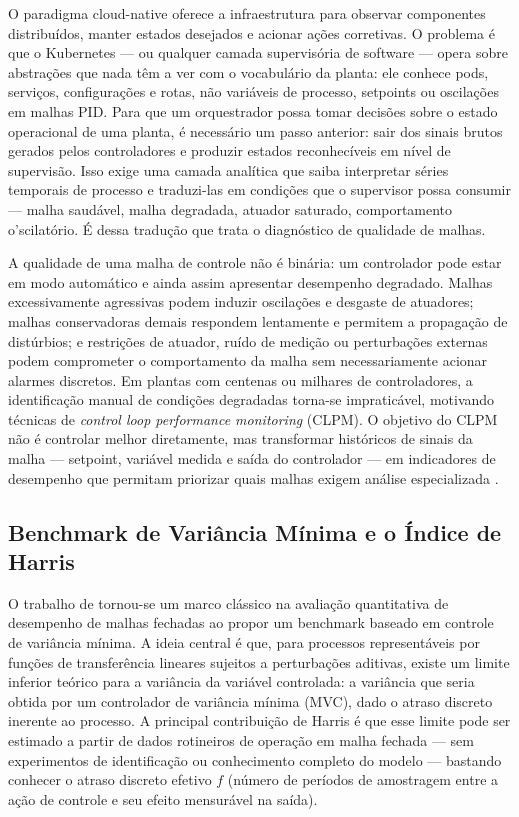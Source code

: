O paradigma cloud-native oferece a infraestrutura para observar componentes distribuídos, manter estados desejados e acionar ações corretivas. O problema é que o Kubernetes --- ou qualquer camada supervisória de software --- opera sobre abstrações que nada têm a ver com o vocabulário da planta: ele conhece pods, serviços, configurações e rotas, não variáveis de processo, setpoints ou oscilações em malhas PID. Para que um orquestrador possa tomar decisões sobre o estado operacional de uma planta, é necessário um passo anterior: sair dos sinais brutos gerados pelos controladores e produzir estados reconhecíveis em nível de supervisão. Isso exige uma camada analítica que saiba interpretar séries temporais de processo e traduzi-las em condições que o supervisor possa consumir --- malha saudável, malha degradada, atuador saturado, comportamento o'scilatório. É dessa tradução que trata o diagnóstico de qualidade de malhas.

A qualidade de uma malha de controle não é binária: um controlador pode estar em modo automático e ainda assim apresentar desempenho degradado. Malhas excessivamente agressivas podem induzir oscilações e desgaste de atuadores; malhas conservadoras demais respondem lentamente e permitem a propagação de distúrbios; e restrições de atuador, ruído de medição ou perturbações externas podem comprometer o comportamento da malha sem necessariamente acionar alarmes discretos. Em plantas com centenas ou milhares de controladores, a identificação manual de condições degradadas torna-se impraticável, motivando técnicas de \textit{control loop performance monitoring} (CLPM). O objetivo do CLPM não é controlar melhor diretamente, mas transformar históricos de sinais da malha --- setpoint, variável medida e saída do controlador --- em indicadores de desempenho que permitam priorizar quais malhas exigem análise especializada \cite{Bradu2018}.

\subsection{Benchmark de Variância Mínima e o Índice de Harris}

O trabalho de  tornou-se um marco clássico na avaliação quantitativa de desempenho de malhas fechadas ao propor um benchmark baseado em controle de variância mínima. A ideia central é que, para processos representáveis por funções de transferência lineares sujeitos a perturbações aditivas, existe um limite inferior teórico para a variância da variável controlada: a variância que seria obtida por um controlador de variância mínima (MVC), dado o atraso discreto inerente ao processo. A principal contribuição de Harris é que esse limite pode ser estimado a partir de dados rotineiros de operação em malha fechada --- sem experimentos de identificação ou conhecimento completo do modelo --- bastando conhecer o atraso discreto efetivo $f$ (número de períodos de amostragem entre a ação de controle e seu efeito mensurável na saída).

